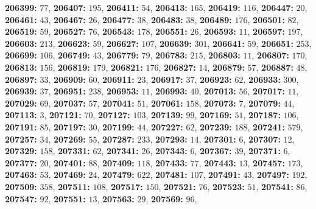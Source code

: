 \textsf{\bfseries 206399:} $77$, \textsf{\bfseries 206407:} $195$, \textsf{\bfseries 206411:} $54$, \textsf{\bfseries 206413:} $165$, \textsf{\bfseries 206419:} $116$, \textsf{\bfseries 206447:} $20$, \textsf{\bfseries 206461:} $43$, \textsf{\bfseries 206467:} $26$, \textsf{\bfseries 206477:} $38$, \textsf{\bfseries 206483:} $38$, \textsf{\bfseries 206489:} $176$, \textsf{\bfseries 206501:} $82$, \textsf{\bfseries 206519:} $59$, \textsf{\bfseries 206527:} $76$, \textsf{\bfseries 206543:} $178$, \textsf{\bfseries 206551:} $26$, \textsf{\bfseries 206593:} $11$, \textsf{\bfseries 206597:} $197$, \textsf{\bfseries 206603:} $213$, \textsf{\bfseries 206623:} $59$, \textsf{\bfseries 206627:} $107$, \textsf{\bfseries 206639:} $301$, \textsf{\bfseries 206641:} $59$, \textsf{\bfseries 206651:} $253$, \textsf{\bfseries 206699:} $106$, \textsf{\bfseries 206749:} $43$, \textsf{\bfseries 206779:} $79$, \textsf{\bfseries 206783:} $215$, \textsf{\bfseries 206803:} $11$, \textsf{\bfseries 206807:} $170$, \textsf{\bfseries 206813:} $156$, \textsf{\bfseries 206819:} $179$, \textsf{\bfseries 206821:} $176$, \textsf{\bfseries 206827:} $14$, \textsf{\bfseries 206879:} $57$, \textsf{\bfseries 206887:} $48$, \textsf{\bfseries 206897:} $33$, \textsf{\bfseries 206909:} $60$, \textsf{\bfseries 206911:} $23$, \textsf{\bfseries 206917:} $37$, \textsf{\bfseries 206923:} $62$, \textsf{\bfseries 206933:} $300$, \textsf{\bfseries 206939:} $37$, \textsf{\bfseries 206951:} $238$, \textsf{\bfseries 206953:} $11$, \textsf{\bfseries 206993:} $40$, \textsf{\bfseries 207013:} $56$, \textsf{\bfseries 207017:} $11$, \textsf{\bfseries 207029:} $69$, \textsf{\bfseries 207037:} $57$, \textsf{\bfseries 207041:} $51$, \textsf{\bfseries 207061:} $158$, \textsf{\bfseries 207073:} $7$, \textsf{\bfseries 207079:} $44$, \textsf{\bfseries 207113:} $3$, \textsf{\bfseries 207121:} $70$, \textsf{\bfseries 207127:} $103$, \textsf{\bfseries 207139:} $99$, \textsf{\bfseries 207169:} $51$, \textsf{\bfseries 207187:} $106$, \textsf{\bfseries 207191:} $85$, \textsf{\bfseries 207197:} $30$, \textsf{\bfseries 207199:} $44$, \textsf{\bfseries 207227:} $62$, \textsf{\bfseries 207239:} $188$, \textsf{\bfseries 207241:} $579$, \textsf{\bfseries 207257:} $34$, \textsf{\bfseries 207269:} $55$, \textsf{\bfseries 207287:} $233$, \textsf{\bfseries 207293:} $14$, \textsf{\bfseries 207301:} $6$, \textsf{\bfseries 207307:} $12$, \textsf{\bfseries 207329:} $158$, \textsf{\bfseries 207331:} $62$, \textsf{\bfseries 207341:} $26$, \textsf{\bfseries 207343:} $6$, \textsf{\bfseries 207367:} $39$, \textsf{\bfseries 207371:} $6$, \textsf{\bfseries 207377:} $20$, \textsf{\bfseries 207401:} $88$, \textsf{\bfseries 207409:} $118$, \textsf{\bfseries 207433:} $77$, \textsf{\bfseries 207443:} $13$, \textsf{\bfseries 207457:} $173$, \textsf{\bfseries 207463:} $53$, \textsf{\bfseries 207469:} $24$, \textsf{\bfseries 207479:} $622$, \textsf{\bfseries 207481:} $107$, \textsf{\bfseries 207491:} $43$, \textsf{\bfseries 207497:} $192$, \textsf{\bfseries 207509:} $358$, \textsf{\bfseries 207511:} $108$, \textsf{\bfseries 207517:} $150$, \textsf{\bfseries 207521:} $76$, \textsf{\bfseries 207523:} $51$, \textsf{\bfseries 207541:} $86$, \textsf{\bfseries 207547:} $92$, \textsf{\bfseries 207551:} $13$, \textsf{\bfseries 207563:} $29$, \textsf{\bfseries 207569:} $96$, 
